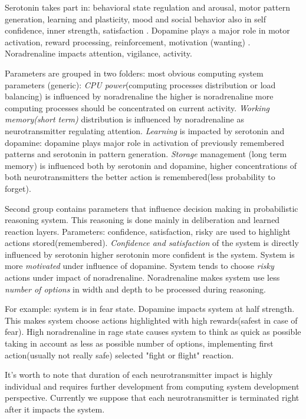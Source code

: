 Serotonin takes part in: behavioral state regulation and arousal, motor pattern generation, learning and plasticity, mood and social behavior \cite{anatomic} also in self confidence, inner strength, satisfaction \cite{cubeofemotions}. Dopamine plays a major role in motor activation, reward processing, reinforcement, motivation (wanting) \cite{cubeofemotions, emotionsbraintorobot, roleofemotions}. Noradrenaline impacts attention, vigilance, activity\cite{cubeofemotions}.

Parameters are grouped in two folders: most obvious computing system parameters (generic):
\emph{CPU power}(computing processes distribution or load balancing) is influenced by noradrenaline the higher is noradrenaline more computing processes should be concentrated on current activity.
\emph{Working memory(short term)} distribution is influenced by noradrenaline as neurotransmitter regulating attention.
\emph{Learning} is impacted by serotonin and dopamine: dopamine plays major role in activation of previously remembered patterns and serotonin in pattern generation.
\emph{Storage} management (long term memory) is influenced both by serotonin and dopamine, higher concentrations of both neurotransmitters the better action is remembered(less probability to forget).

Second group contains parameters that influence decision making in probabilistic reasoning system. This reasoning is done mainly in deliberation and learned reaction layers.
Parameters: confidence, satisfaction, risky are used to highlight actions stored(remembered).
\emph{Confidence and satisfaction} of the system is directly influenced by serotonin higher serotonin more confident is the system.
System is more \emph{motivated} under influence of dopamine.
System tends to choose \emph{risky} actions under impact of noradrenaline.
Noradrenaline makes system use less \emph{number of options} in width and depth to be processed during reasoning.

For example: system is in fear state. Dopamine impacts system at half strength. This makes system choose actions highlighted with high rewards(safest in case of fear). High noradrenaline in rage state causes system to think as quick as possible taking in account as less as possible number of options, implementing first action(usually not really safe) selected "fight or flight" reaction.

It's worth to note that duration of each neurotransmitter impact is highly individual and requires further development from computing system development perspective. Currently we suppose that each neurotransmitter is terminated right after it impacts the system.

